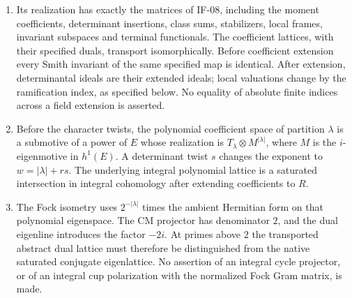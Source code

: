 \begin{enumerate}
\item Its realization has exactly the matrices of IF-08, including the
moment coefficients, determinant insertions, class sums, stabilizers,
local frames, invariant subspaces and terminal functionals. The
coefficient lattices, with their specified duals, transport isomorphically.
Before coefficient extension every Smith invariant of the same specified
map is identical. After extension, determinantal ideals are their extended
ideals; local valuations change by the ramification index, as specified
below. No equality of absolute finite indices across a field extension
is asserted.
\item Before the character twists, the polynomial coefficient space of
partition $\lambda$ is a submotive of a power of $E$ whose realization is
$T_\lambda\otimes M^{|\lambda|}$, where $M$ is the $i$-eigenmotive in
$h^1(E)$. A determinant twist $s$ changes the exponent to
$w=|\lambda|+rs$. The underlying integral polynomial lattice is a
saturated intersection in integral cohomology after extending coefficients
to $R$.
\item The Fock isometry uses $2^{-|\lambda|}$ times the ambient
Hermitian form on that polynomial eigenspace. The CM projector has
denominator $2$, and the dual eigenline introduces the factor $-2i$.
At primes above $2$ the transported abstract dual lattice must therefore
be distinguished from the native saturated conjugate eigenlattice.
No assertion of an integral cycle projector, or of an integral cup
polarization with the normalized Fock Gram matrix, is made.
\end{enumerate}


